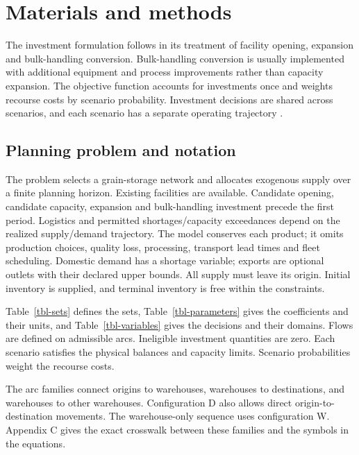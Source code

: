 \documentclass[
  english,
  11pt,
  a4paper,
  authoryear,
  preprint]{elsarticle}
\begin{document}
\section{Materials and methods}\label{materials-and-methods}

The investment formulation follows \citet{rosa2026thesis} in its
treatment of facility opening, expansion and bulk-handling conversion.
Bulk-handling conversion is usually implemented with additional equipment and process improvements rather than capacity expansion.
The objective function accounts for investments once and weights recourse costs by scenario probability. Investment decisions are shared across
scenarios, and each scenario has a separate operating trajectory
\citep{birge2011}.

\subsection{Planning problem and
notation}\label{planning-problem-and-notation}

The problem selects a grain-storage network and allocates exogenous
supply over a finite planning horizon. Existing facilities are
available. Candidate opening, candidate capacity, expansion and
bulk-handling investment precede the first period. Logistics and
permitted shortages/capacity exceedances depend on the realized
supply/demand trajectory. The model conserves each product; it omits
production choices, quality loss, processing, transport lead times and
fleet scheduling. Domestic demand has a shortage variable; exports are
optional outlets with their declared upper bounds. All supply must leave
its origin. Initial inventory is supplied, and terminal inventory is
free within the constraints.

Table~\ref{tbl-sets} defines the sets, Table~\ref{tbl-parameters} gives
the coefficients and their units, and Table~\ref{tbl-variables} gives
the decisions and their domains. Flows are defined on admissible arcs.
Ineligible investment quantities are zero. Each scenario satisfies the
physical balances and capacity limits. Scenario probabilities weight the
recourse costs.

The arc families connect origins to warehouses, warehouses to
destinations, and warehouses to other warehouses. Configuration D also
allows direct origin-to-destination movements. The warehouse-only
sequence uses configuration W. Appendix C gives the exact crosswalk
between these families and the symbols in the equations.
\end{document}
